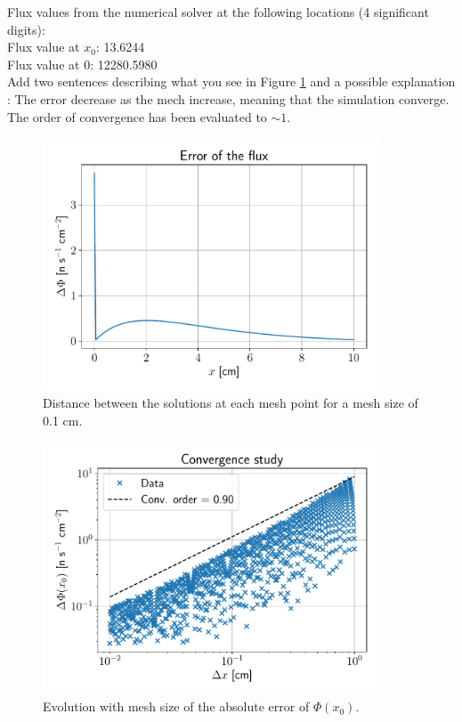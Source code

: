 \documentclass[11pt,a4paper]{article}
\begin{document}
Flux values from the numerical solver at the following locations (4 significant digits):\\
Flux value at $x_0$: 13.6244 \\
Flux value at $0$: 12280.5980 \\

Add two sentences describing what you see in Figure \ref{err} and a possible explanation :
The error decrease as the mech increase, meaning that the simulation converge. The order of convergence has been evaluated to $\sim  1$. 

\begin{figure}[H]
	\includegraphics[width=10cm]{fig/Ex1_Error.pdf}
	\centering
	\caption{Distance between the solutions at each mesh point for a mesh size of 0.1 cm.}
\end{figure}

\begin{figure}[H]
\includegraphics[width=10cm]{fig/Ex1_conv_N1000.pdf}
\centering
\caption{Evolution with mesh size of the absolute error of $\Phi(x_0)$.}
\label{err}
\end{figure}
\end{document}
